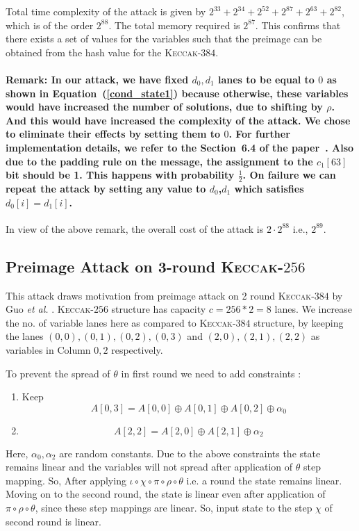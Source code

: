 \documentclass[runningheads]{llncs}
\newcommand{\Keccak}{\mbox{\textsc{Keccak}}}
\newcommand{\etal}{\textit{et al. }}
\begin{document}
Total time complexity of the attack is given by $2^{33} + 2^{34} + 2^{52} + 2^{87} + 2^{63} + 2^{82}$, which is of the order $2^{88}$.
 The total memory required is $2^{87}$. 
This confirms that there exists a set of values for the variables such that the preimage can be obtained from the hash value for the  \Keccak-$384$.


\paragraph{\textbf{Remark:}
In our attack, we have fixed $d_0, d_1$ lanes to be equal to $0$ as shown in Equation~(\ref{cond_state1}) because otherwise, these variables would have increased the number of solutions, due to shifting by $\rho$. 
And this would have increased the complexity of the attack. We chose to eliminate their effects by setting them to $0$. For further implementation details, we refer to the Section~6.4 of the paper~\cite{naya2011practical}. Also due to the padding rule on the message, the assignment to the $c_1[63]$ bit should be 1. This happens with probability $\tfrac{1}{2}$. On failure we can repeat the attack by setting any value to $d_0$,$d_1$ which satisfies $d_0[i]=d_1[i]$. \\
}

In view of the above remark, the overall cost of the attack is $2\cdot 2^{88}$ i.e., $2^{89}$.

\subsection{Preimage Attack on 3-round \Keccak-$256$}
This attack draws motivation from preimage attack on 2 round \Keccak-$384$ by Guo \etal. \Keccak-$256$ structure has capacity $c = 256*2 = 8$ lanes. We increase the no. of variable lanes here as compared to \Keccak-$384$ structure, by keeping the lanes $(0,0), (0,1), (0,2), (0,3)$ and $(2,0), (2,1), (2,2)$ as variables in Column $0, 2$ respectively.

To prevent the spread of $\theta$ in first round we need to add constraints :
\begin{enumerate}
\item Keep \[
        A[0,3] = A[0,0] \oplus A[0,1] \oplus A[0, 2] \oplus \alpha_0
    \]
\item \[
        A[2,2] = A[2,0] \oplus A[2,1] \oplus \alpha_2
    \]
\end{enumerate}
Here, $\alpha_0, \alpha_2$ are random constants.
Due to the above constraints the state remains linear and the variables will not spread after application of $\theta$ step mapping. So, After applying $\iota \circ \chi \circ \pi \circ \rho \circ \theta $ i.e. a round the state remains linear.
Moving on to the second round, the state is linear even after application of $\pi \circ \rho \circ \theta$, since these step mappings are linear. So, input state to the step $\chi$ of second round is linear.
\end{document}
